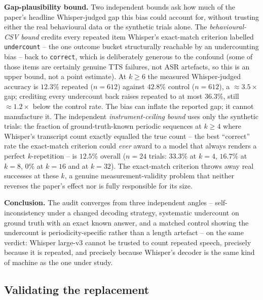 \documentclass[11pt]{article}
\begin{document}
\textbf{Gap-plausibility bound.} Two independent bounds ask how much of the
paper's headline Whisper-judged gap this bias could account for, without
trusting either the real behavioural data or the synthetic trials alone. The
\emph{behavioural-CSV bound} credits every repeated item Whisper's
exact-match criterion labelled \texttt{undercount} -- the one outcome bucket
structurally reachable by an undercounting bias -- back to \texttt{correct},
which is deliberately generous to the confound (some of those items are
certainly genuine TTS failures, not ASR artefacts, so this is an upper bound,
not a point estimate). At $k\ge6$ the measured Whisper-judged accuracy is
$12.3\%$ repeated ($n{=}612$) against $42.8\%$ control ($n{=}612$), a
$\approx3.5\times$ gap; crediting every undercount back raises repeated to
at most $36.3\%$, still $\approx1.2\times$ below the control rate. The bias
can inflate the reported gap; it cannot manufacture it. The independent
\emph{instrument-ceiling bound} uses only the synthetic trials: the fraction
of ground-truth-known periodic sequences at $k\ge4$ where Whisper's
transcript count exactly equalled the true count -- the best ``correct''
rate the exact-match criterion could \emph{ever} award to a model that
always renders a perfect $k$-repetition -- is $12.5\%$ overall ($n{=}24$
trials: $33.3\%$ at $k{=}4$, $16.7\%$ at $k{=}8$, $0\%$ at $k{=}16$ and at
$k{=}32$). The exact-match criterion throws away real successes at these
$k$, a genuine measurement-validity problem that neither reverses the
paper's effect nor is fully responsible for its size.

\textbf{Conclusion.} The audit converges from three independent angles --
self-inconsistency under a changed decoding strategy, systematic undercount
on ground truth with an exact known answer, and a matched control showing
the undercount is periodicity-specific rather than a length artefact -- on
the same verdict: Whisper large-v3 cannot be trusted to count repeated
speech, precisely because it is repeated, and precisely because Whisper's
decoder is the same kind of machine as the one under study.

\subsection{Validating the replacement}
\label{sec:s9-ctc}
\end{document}
